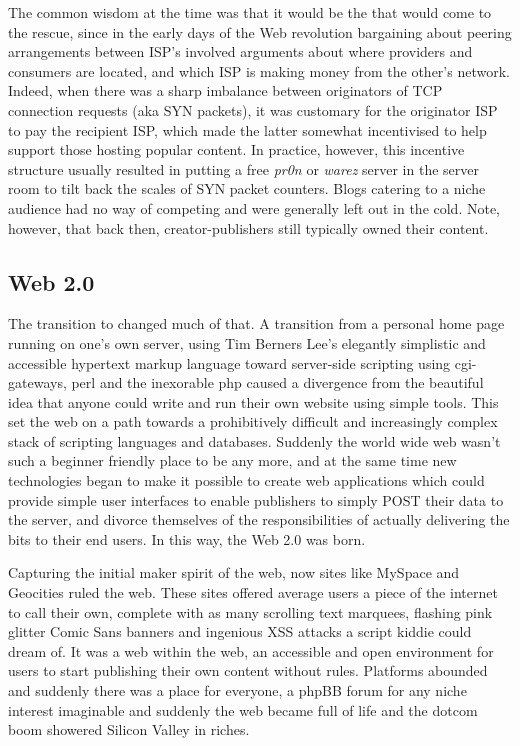 The common wisdom at the time was that it would be the  that would come to the rescue, since in the early days of the Web revolution bargaining about peering arrangements between ISP's involved arguments about where providers and consumers are located, and which ISP is making money from the other's network. Indeed, when there was a sharp imbalance between originators of TCP connection requests (aka SYN packets), it was customary for the originator ISP to pay the recipient ISP, which made the latter somewhat incentivised to help support those hosting popular content. In practice, however, this incentive structure usually resulted in putting a free \emph{pr0n} or \emph{warez} server in the server room to tilt back the scales of SYN packet counters. Blogs catering to a niche audience had no way of competing and were generally left out in the cold. Note, however, that back then, creator-publishers still typically owned their content.

\subsection{Web 2.0 \statusgreen}\label{sec:web_2}

The transition to  changed much of that. A transition from a personal home page running on one's own server, using Tim Berners Lee's elegantly simplistic and accessible hypertext markup language toward server-side scripting using cgi-gateways, perl and the inexorable php caused a divergence from the beautiful idea that anyone could write and run their own website using simple tools. This set the web on a path towards a prohibitively difficult and increasingly complex stack of scripting languages and databases. Suddenly the world wide web wasn't such a beginner friendly place to be any more, and at the same time new technologies began to make it possible to create web applications which could provide simple user interfaces to enable publishers to simply POST their data to the server, and divorce themselves of the responsibilities of actually delivering the bits to their end users. In this way, the Web 2.0 was born.

Capturing the initial maker spirit of the web, now sites like MySpace and Geocities ruled the web. These sites offered average users a piece of the internet to call their own, complete with as many scrolling text marquees, flashing pink glitter Comic Sans banners and ingenious XSS attacks a script kiddie could dream of. It was a web within the web, an accessible and open environment for users to start publishing their own content without rules. Platforms abounded and suddenly there was a place for everyone, a phpBB forum for any niche interest imaginable and suddenly the web became full of life and the dotcom boom showered Silicon Valley in riches.

